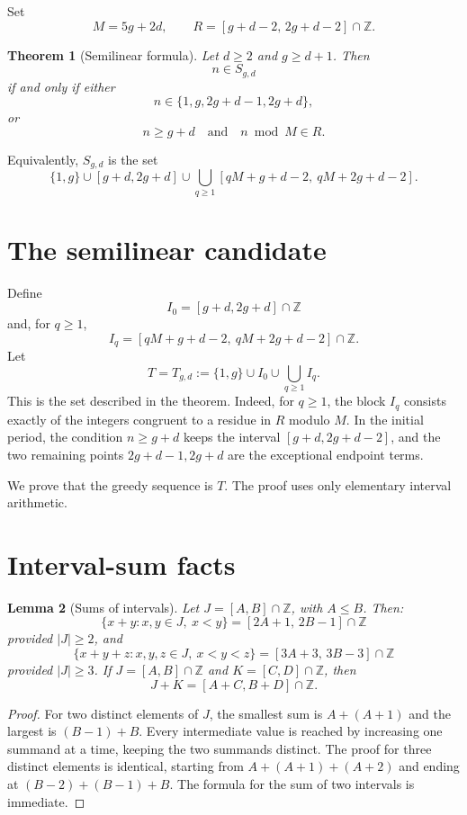 \documentclass[11pt]{article}
\newtheorem{theorem}{Theorem}[section]
\newtheorem{lemma}[theorem]{Lemma}
\begin{document}
Set
\[
M=5g+2d,
\qquad
R=[g+d-2,\,2g+d-2]\cap\mathbb Z.
\]

\begin{theorem}[Semilinear formula]
Let \(d\geq 2\) and \(g\geq d+1\). Then
\[
n\in S_{g,d}
\]
if and only if either
\[
n\in \{1,g,2g+d-1,2g+d\},
\]
or
\[
n\geq g+d
\quad\text{and}\quad
n\bmod M\in R.
\]
\end{theorem}

Equivalently, \(S_{g,d}\) is the set
\[
\{1,g\}\cup [g+d,2g+d]\cup
\bigcup_{q\geq 1}
[qM+g+d-2,\ qM+2g+d-2].
\]

\section{The semilinear candidate}

Define
\[
I_0=[g+d,2g+d]\cap\mathbb Z
\]
and, for \(q\geq 1\),
\[
I_q=[qM+g+d-2,\ qM+2g+d-2]\cap\mathbb Z.
\]
Let
\[
T=T_{g,d}:=\{1,g\}\cup I_0\cup\bigcup_{q\geq 1}I_q.
\]
This is the set described in the theorem. Indeed, for \(q\geq 1\), the block \(I_q\) consists exactly of the integers congruent to a residue in \(R\) modulo \(M\). In the initial period, the condition \(n\geq g+d\) keeps the interval \([g+d,2g+d-2]\), and the two remaining points \(2g+d-1,2g+d\) are the exceptional endpoint terms.

We prove that the greedy sequence is \(T\). The proof uses only elementary interval arithmetic.

\section{Interval-sum facts}

\begin{lemma}[Sums of intervals]
Let \(J=[A,B]\cap\mathbb Z\), with \(A\leq B\). Then:
\[
\{x+y:x,y\in J,\ x<y\}=[2A+1,\,2B-1]\cap\mathbb Z
\]
provided \(|J|\geq 2\), and
\[
\{x+y+z:x,y,z\in J,\ x<y<z\}=[3A+3,\,3B-3]\cap\mathbb Z
\]
provided \(|J|\geq 3\). If \(J=[A,B]\cap\mathbb Z\) and \(K=[C,D]\cap\mathbb Z\), then
\[
J+K=[A+C,B+D]\cap\mathbb Z.
\]
\end{lemma}

\begin{proof}
For two distinct elements of \(J\), the smallest sum is \(A+(A+1)\) and the largest is \((B-1)+B\). Every intermediate value is reached by increasing one summand at a time, keeping the two summands distinct. The proof for three distinct elements is identical, starting from \(A+(A+1)+(A+2)\) and ending at \((B-2)+(B-1)+B\). The formula for the sum of two intervals is immediate.
\end{proof}
\end{document}

